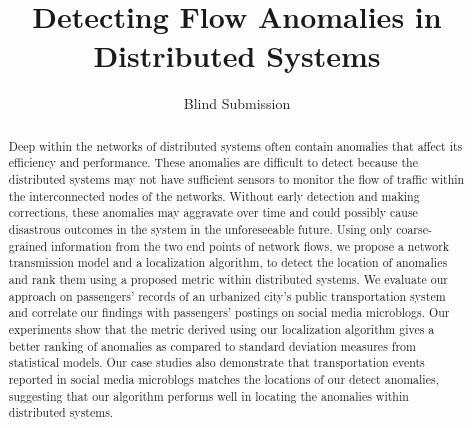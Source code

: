 \documentclass[conference]{IEEEtran.1.8}
\begin{document}
\title{Detecting Flow Anomalies in Distributed Systems}

\author{
	Blind Submission
}

\maketitle

\begin{abstract}
Deep within the networks of distributed systems often contain anomalies that affect its efficiency and performance. These anomalies are difficult to detect because the distributed systems may not have sufficient sensors to monitor the flow of traffic within the interconnected nodes of the networks. Without early detection and making corrections, these anomalies may aggravate over time and could possibly cause disastrous outcomes in the system in the unforeseeable future. Using only coarse-grained information from the two end points of network flows, we propose a network transmission model and a localization algorithm, to detect the location of anomalies and rank them using a proposed metric within distributed systems. We evaluate our approach on passengers' records of an urbanized city's public transportation system and correlate our findings with passengers' postings on social media microblogs. Our experiments show that the metric derived using our localization algorithm gives a better ranking of anomalies as compared to standard deviation measures from statistical models. Our case studies also demonstrate that transportation events reported in social media microblogs matches the locations of our detect anomalies, suggesting that our algorithm performs well in locating the anomalies within distributed systems.
\end{abstract}
\end{document}
